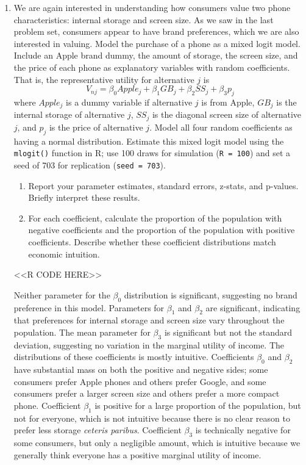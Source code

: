 \documentclass[11pt,letterpaper]{article}
\begin{document}
\begin{enumerate}[label=\alph*., leftmargin=*]
	\item We are again interested in understanding how consumers value two phone characteristics: internal storage and screen size. As we saw in the last problem set, consumers appear to have brand preferences, which we are also interested in valuing. Model the purchase of a phone as a mixed logit model. Include an Apple brand dummy, the amount of storage, the screen size, and the price of each phone as explanatory variables with random coefficients. That is, the representative utility for alternative $j$ is
	$$V_{nj} = \beta_0 Apple_j + \beta_1 GB_j + \beta_2 SS_j + \beta_3 p_j$$
	where $Apple_j$ is a dummy variable if alternative $j$ is from Apple, $GB_j$ is the internal storage of alternative $j$, $SS_j$ is the diagonal screen size of alternative $j$, and $p_j$ is the price of alternative $j$. Model all four random coefficients as having a normal distribution. Estimate this mixed logit model using the \texttt{mlogit()} function in R; use 100 draws for simulation (\texttt{R = 100}) and set a seed of 703 for replication (\texttt{seed = 703}).
	\begin{enumerate}[label=\roman*.]
		\item Report your parameter estimates, standard errors, z-stats, and p-values. Briefly interpret these results. 
		\item For each coefficient, calculate the proportion of the population with negative coefficients and the proportion of the population with positive coefficients. Describe whether these coefficient distributions match economic intuition.
	\end{enumerate}

	<<R CODE HERE>>

	Neither parameter for the $\beta_0$ distribution is significant, suggesting no brand preference in this model. Parameters for $\beta_1$ and $\beta_2$ are significant, indicating that preferences for internal storage and screen size vary throughout the population. The mean parameter for $\beta_3$ is significant but not the standard deviation, suggesting no variation in the marginal utility of income. The distributions of these coefficients is mostly intuitive. Coefficients $\beta_0$ and $\beta_2$ have substantial mass on both the positive and negative sides; some consumers prefer Apple phones and others prefer Google, and some consumers prefer a larger screen size and others prefer a more compact phone. Coefficient $\beta_1$ is positive for a large proportion of the population, but not for everyone, which is not intuitive because there is no clear reason to prefer less storage \emph{ceteris paribus}. Coefficient $\beta_3$ is technically negative for some consumers, but only a negligible amount, which is intuitive because we generally think everyone has a positive marginal utility of income. 


\end{enumerate}
\end{document}
